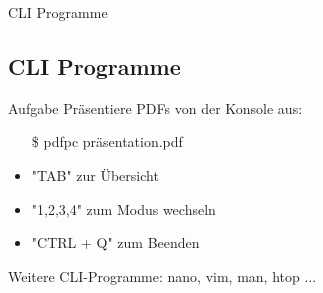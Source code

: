 \begin{frame}{CLI Programme}
    \subsection{CLI Programme}\label{subsec:cli-programme}

    \begin{alertblock}{Aufgabe}
        Präsentiere PDFs von der Konsole aus:
        \begin{itemize}
            \item[\$] pdfpc präsentation.pdf\pause
            \item "TAB" zur Übersicht\pause
            \item "1,2,3,4" zum Modus wechseln\pause
            \item "CTRL + Q" zum Beenden
        \end{itemize}
    \end{alertblock}
    \pause

    Weitere CLI-Programme: nano, vim, man, htop ...

\end{frame}
